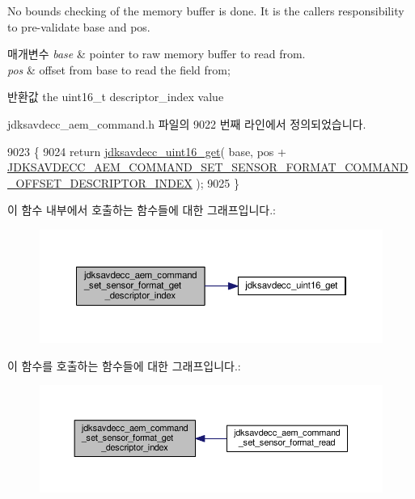 No bounds checking of the memory buffer is done. It is the caller\textquotesingle{}s responsibility to pre-\/validate base and pos.


\begin{DoxyParams}{매개변수}
{\em base} & pointer to raw memory buffer to read from. \\
\hline
{\em pos} & offset from base to read the field from; \\
\hline
\end{DoxyParams}
\begin{DoxyReturn}{반환값}
the uint16\+\_\+t descriptor\+\_\+index value 
\end{DoxyReturn}


jdksavdecc\+\_\+aem\+\_\+command.\+h 파일의 9022 번째 라인에서 정의되었습니다.


\begin{DoxyCode}
9023 \{
9024     \textcolor{keywordflow}{return} \hyperlink{group__endian_ga3fbbbc20be954aa61e039872965b0dc9}{jdksavdecc\_uint16\_get}( base, pos + 
      \hyperlink{group__command__set__sensor__format_ga6ecab266ea9cb7a12d578502ad898970}{JDKSAVDECC\_AEM\_COMMAND\_SET\_SENSOR\_FORMAT\_COMMAND\_OFFSET\_DESCRIPTOR\_INDEX}
       );
9025 \}
\end{DoxyCode}


이 함수 내부에서 호출하는 함수들에 대한 그래프입니다.\+:
\nopagebreak
\begin{figure}[H]
\begin{center}
\leavevmode
\includegraphics[width=350pt]{group__command__set__sensor__format_ga11bea3bd4375eb7c11af1e36ba7651d1_cgraph}
\end{center}
\end{figure}




이 함수를 호출하는 함수들에 대한 그래프입니다.\+:
\nopagebreak
\begin{figure}[H]
\begin{center}
\leavevmode
\includegraphics[width=350pt]{group__command__set__sensor__format_ga11bea3bd4375eb7c11af1e36ba7651d1_icgraph}
\end{center}
\end{figure}


